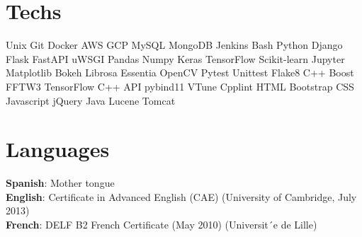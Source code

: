 \documentclass[]{deedy-resume-openfont}
\begin{document}
\begin{minipage}[t]{0.30\textwidth}
\section{Techs}
Unix \textbullet{}   Git \textbullet{} Docker \textbullet{} AWS \textbullet{} GCP \textbullet{} MySQL \textbullet{} MongoDB \textbullet{} Jenkins \textbullet{} Bash
\textbullet{} Python \textbullet{} Django \textbullet{} Flask \textbullet{} FastAPI \textbullet{} uWSGI
\textbullet{} Pandas \textbullet{} Numpy \textbullet{} Keras \textbullet{} TensorFlow
\textbullet{} Scikit-learn \textbullet{} Jupyter \textbullet{} Matplotlib
\textbullet{} Bokeh \textbullet{} Librosa \textbullet{} Essentia
\textbullet{} OpenCV
\textbullet{} Pytest \textbullet{} Unittest \textbullet{} Flake8
\textbullet{} C++ \textbullet{} Boost \textbullet{} FFTW3 \textbullet{} TensorFlow C++ API \textbullet{} pybind11 \textbullet{} VTune \textbullet{} Cpplint \textbullet{} HTML \textbullet{} Bootstrap \textbullet{} CSS \textbullet{} Javascript \textbullet{} jQuery \textbullet{} Java \textbullet{} Lucene \textbullet{} Tomcat

\vspace{0.5cm}
\section{Languages}
{\bf Spanish}: Mother tongue \\
{\bf English}: Certificate in Advanced English (CAE) (University of Cambridge, July 2013) \\
{\bf French}: DELF B2 French Certificate (May 2010)
(Universit´e de Lille) \\

\sectionsep

%
%

\end{minipage} 
\hfill
\end{document}
